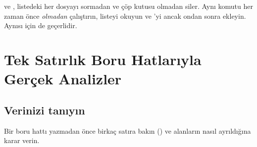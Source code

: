 \begin{tryit}
 ve , listedeki her dosyayı sormadan ve çöp kutusu olmadan siler. Aynı komutu her zaman önce  \emph{olmadan} çalıştırın, listeyi okuyun ve 'yi ancak ondan sonra ekleyin. Aynısı  için de geçerlidir.
\end{tryit}

\section{Tek Satırlık Boru Hatlarıyla Gerçek Analizler}
\label{sec:analysis}

\subsection{Verinizi tanıyın}

Bir boru hattı yazmadan önce birkaç satıra bakın () ve alanların nasıl ayrıldığına karar verin.

